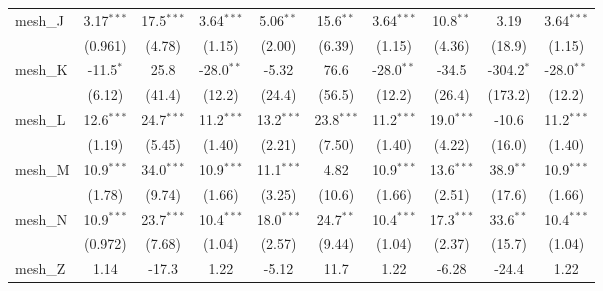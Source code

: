 \begin{tabular}{lccccccccc}
   mesh\_J                                                     & 3.17$^{***}$  & 17.5$^{***}$   & 3.64$^{***}$  & 5.06$^{**}$   & 15.6$^{**}$   & 3.64$^{***}$  & 10.8$^{**}$   & 3.19           & 3.64$^{***}$\\   
                                                               & (0.961)       & (4.78)         & (1.15)        & (2.00)        & (6.39)        & (1.15)        & (4.36)        & (18.9)         & (1.15)\\   
   mesh\_K                                                     & -11.5$^{*}$   & 25.8           & -28.0$^{**}$  & -5.32         & 76.6          & -28.0$^{**}$  & -34.5         & -304.2$^{*}$   & -28.0$^{**}$\\   
                                                               & (6.12)        & (41.4)         & (12.2)        & (24.4)        & (56.5)        & (12.2)        & (26.4)        & (173.2)        & (12.2)\\   
   mesh\_L                                                     & 12.6$^{***}$  & 24.7$^{***}$   & 11.2$^{***}$  & 13.2$^{***}$  & 23.8$^{***}$  & 11.2$^{***}$  & 19.0$^{***}$  & -10.6          & 11.2$^{***}$\\   
                                                               & (1.19)        & (5.45)         & (1.40)        & (2.21)        & (7.50)        & (1.40)        & (4.22)        & (16.0)         & (1.40)\\   
   mesh\_M                                                     & 10.9$^{***}$  & 34.0$^{***}$   & 10.9$^{***}$  & 11.1$^{***}$  & 4.82          & 10.9$^{***}$  & 13.6$^{***}$  & 38.9$^{**}$    & 10.9$^{***}$\\   
                                                               & (1.78)        & (9.74)         & (1.66)        & (3.25)        & (10.6)        & (1.66)        & (2.51)        & (17.6)         & (1.66)\\   
   mesh\_N                                                     & 10.9$^{***}$  & 23.7$^{***}$   & 10.4$^{***}$  & 18.0$^{***}$  & 24.7$^{**}$   & 10.4$^{***}$  & 17.3$^{***}$  & 33.6$^{**}$    & 10.4$^{***}$\\   
                                                               & (0.972)       & (7.68)         & (1.04)        & (2.57)        & (9.44)        & (1.04)        & (2.37)        & (15.7)         & (1.04)\\   
   mesh\_Z                                                     & 1.14          & -17.3          & 1.22          & -5.12         & 11.7          & 1.22          & -6.28         & -24.4          & 1.22\\   

\end{tabular}
